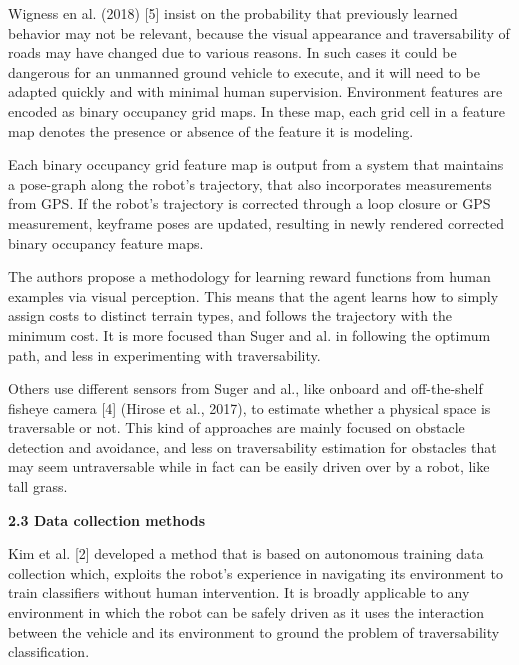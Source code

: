 \documentclass[12pt,a4paper]{report}
\begin{document}
	Wigness en al. (2018) [5] insist on the probability that previously learned 
	behavior may not be relevant, because the visual appearance and traversability 
	of roads may have changed due to various reasons. In such cases it could be 
	dangerous for an unmanned ground vehicle to execute, and it will need to be 
	adapted quickly and with minimal human supervision.
	Environment features are encoded as binary occupancy grid maps. In these map, 
	each grid cell in a feature map denotes the presence or absence of the feature 
	it is modeling.


        Each binary occupancy grid feature map is output from a 
	system that maintains a pose-graph along the robot’s trajectory, that also 
	incorporates measurements from GPS. If the robot’s trajectory is corrected 
	through a loop closure or GPS measurement, keyframe poses are updated, 
	resulting in newly rendered corrected binary occupancy feature maps.
	
	The authors propose a methodology for learning reward functions from 
	human examples via visual perception. This means that the agent learns 
	how to simply assign costs to distinct terrain types, and follows the 
	trajectory with the minimum cost. It is more focused than Suger and al. in 
	following the optimum path, and less in experimenting with traversability.
	\newline
	
	Others use different sensors from Suger and al., like onboard and off-the-shelf 
	fisheye camera [4] (Hirose et al., 2017), to estimate whether a physical space 
	is traversable or not. This kind of approaches are mainly focused on obstacle 
	detection and avoidance, and less on traversability estimation for obstacles 
	that may seem untraversable while in fact can be easily driven over by a 
	robot, like tall grass.
	\newline\newline
	
	\large\textbf{2.3 Data collection methods}
	\normalsize\newline
	
	Kim et al. [2] developed a method 
	that is based on autonomous training data collection which, exploits the 
	robot’s experience in navigating its environment to train classifiers without 
	human intervention. It is broadly applicable to any environment in which 
	the robot can be safely driven as it uses the interaction between the vehicle
	and its environment to ground the problem of traversability classification.
	
\end{document}
